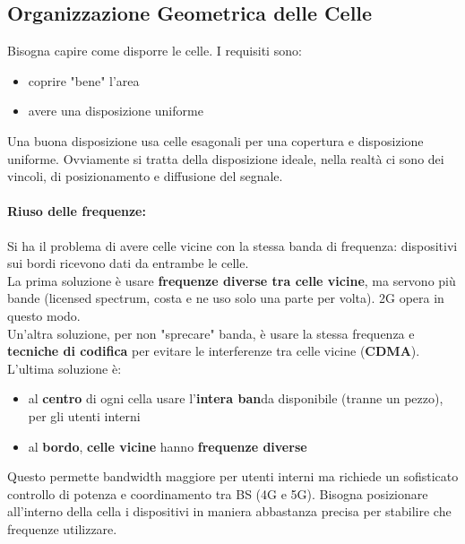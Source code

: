 \subsection{Organizzazione Geometrica delle Celle}

Bisogna capire come disporre le celle. I requisiti sono:
\begin{itemize}
	\item coprire "bene" l'area
	\item avere una disposizione uniforme
\end{itemize}

Una buona disposizione usa celle esagonali per una copertura e disposizione uniforme. Ovviamente si tratta della disposizione ideale, nella realtà ci sono dei vincoli, di posizionamento e diffusione del segnale.\\

\paragraph{Riuso delle frequenze:} Si ha il problema di avere celle vicine con la stessa banda di frequenza: dispositivi sui bordi ricevono dati da entrambe le celle. \\

La prima soluzione è usare \textbf{frequenze diverse tra celle vicine}, ma servono più bande (licensed spectrum, costa e ne uso solo una parte per volta). 2G opera in questo modo.\\

Un'altra soluzione, per non "sprecare" banda, è usare la stessa frequenza e \textbf{tecniche di codifica} per evitare le interferenze tra celle vicine (\textbf{CDMA}).\\

L'ultima soluzione è:
\begin{itemize}
	\item al \textbf{centro} di ogni cella usare l'\textbf{intera ban}da disponibile (tranne un pezzo), per gli utenti interni
	\item al \textbf{bordo}, \textbf{celle vicine} hanno \textbf{frequenze diverse}
\end{itemize}

Questo permette bandwidth maggiore per utenti interni ma richiede un sofisticato controllo di potenza e coordinamento tra BS (4G e 5G). Bisogna posizionare all'interno della cella i dispositivi in maniera abbastanza precisa per stabilire che frequenze utilizzare. \\

